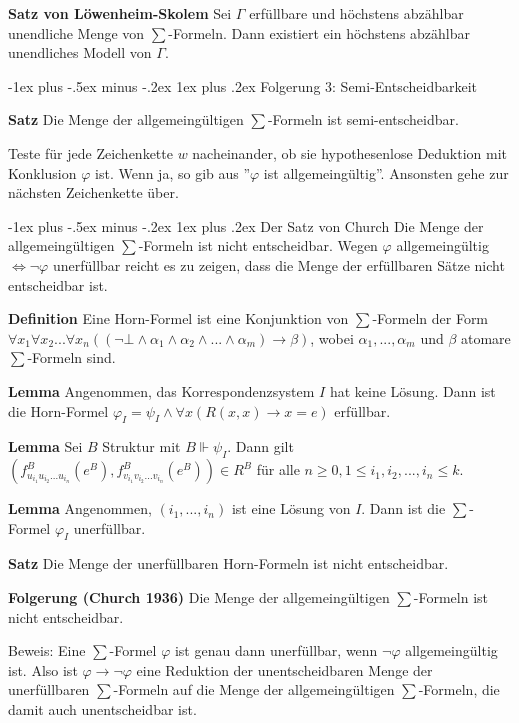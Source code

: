 \documentclass[a4paper]{article}
\makeatletter
\renewcommand{\note}[2]{\begin{noteBox} \textbf{#1} #2 \end{noteBox}}
\renewcommand{\subsubsection}{\@startsection{subsubsection}{3}{0mm}%
                {-1ex plus -.5ex minus -.2ex}%
                {1ex plus .2ex}%
                {\normalfont\small\bfseries}}
\makeatother
\begin{document}
\begin{multicols}{3}
  \note{Satz von Löwenheim-Skolem}{Sei $\Gamma$ erfüllbare und höchstens abzählbar unendliche Menge von $\sum$-Formeln. Dann existiert ein höchstens abzählbar unendliches Modell von $\Gamma$.}

  \subsubsection{Folgerung 3: Semi-Entscheidbarkeit}
  \note{Satz}{Die Menge der allgemeingültigen $\sum$-Formeln ist semi-entscheidbar.}

  Teste für jede Zeichenkette $w$ nacheinander, ob sie hypothesenlose Deduktion mit Konklusion $\varphi$ ist. Wenn ja, so gib aus ''$\varphi$ ist allgemeingültig''. Ansonsten gehe zur nächsten Zeichenkette über.

  \subsubsection{Der Satz von Church}
  Die Menge der allgemeingültigen $\sum$-Formeln ist nicht entscheidbar.
  Wegen $\varphi$ allgemeingültig $\Leftrightarrow\lnot\varphi$ unerfüllbar reicht es zu zeigen, dass die Menge der erfüllbaren Sätze nicht entscheidbar ist.

  \note{Definition}{Eine Horn-Formel ist eine Konjunktion von $\sum$-Formeln der Form $\forall x_1 \forall x_2 ...\forall x_n((\lnot\bot \wedge\alpha_1\wedge\alpha_2\wedge...\wedge\alpha_m)\rightarrow\beta)$, wobei $\alpha_1,...,\alpha_m$ und $\beta$ atomare $\sum$-Formeln sind.}

  \note{Lemma}{Angenommen, das Korrespondenzsystem $I$ hat keine Lösung. Dann ist die Horn-Formel $\varphi_I=\psi_I \wedge \forall x(R(x,x)\rightarrow x=e)$ erfüllbar.}

  \note{Lemma}{Sei $B$ Struktur mit $B\Vdash\psi_I$. Dann gilt $(f_{u_{i_1} u_{i_2} ...u_{i_n}}^B (e^B),f_{v_{i_1} v_{i_2}...v_{i_n}}^B(e^B))\in R^B$ für alle $n\geq 0, 1\leq i_1,i_2,...,i_n \leq k$.}

  \note{Lemma}{Angenommen, $(i_1,...,i_n)$ ist eine Lösung von $I$. Dann ist die $\sum$-Formel $\varphi_I$ unerfüllbar.}

  \note{Satz}{Die Menge der unerfüllbaren Horn-Formeln ist nicht entscheidbar.}

  \note{Folgerung (Church 1936)}{Die Menge der allgemeingültigen $\sum$-Formeln ist nicht entscheidbar.}

  Beweis: Eine $\sum$-Formel $\varphi$ ist genau dann unerfüllbar, wenn $\lnot\varphi$ allgemeingültig ist. Also ist $\varphi\rightarrow\lnot\varphi$ eine Reduktion der unentscheidbaren Menge der unerfüllbaren $\sum$-Formeln auf die Menge der allgemeingültigen $\sum$-Formeln, die damit auch unentscheidbar ist.


\end{multicols}
\end{document}
